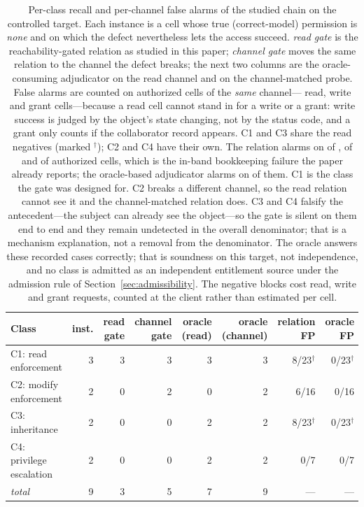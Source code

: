 \begin{table}[t]
\centering
\caption{Per-class recall and per-channel false alarms of the studied chain on the controlled target. Each instance is a cell whose true (correct-model) permission is \emph{none} and on which the defect nevertheless lets the access succeed. \emph{read gate} is the reachability-gated relation as studied in this paper; \emph{channel gate} moves the same relation to the channel the defect breaks; the next two columns are the oracle-consuming adjudicator on the read channel and on the channel-matched probe. False alarms are counted on authorized cells of the \emph{same} channel---\McNegRead{} read, \McNegWrite{} write and \McNegGrant{} grant cells---because a read cell cannot stand in for a write or a grant: write success is judged by the object's state changing, not by the status code, and a grant only counts if the collaborator record appears. C1 and C3 share the read negatives (marked $^{\dagger}$); C2 and C4 have their own. The relation alarms on \McFpRelRead{} of \McNegRead{}, \McFpRelWrite{} of \McNegWrite{} and \McFpRelGrant{} of \McNegGrant{} authorized cells, which is the in-band bookkeeping failure the paper already reports; the oracle-based adjudicator alarms on \McFpOracleMax{} of them. C1 is the class the gate was designed for. C2 breaks a different channel, so the read relation cannot see it and the channel-matched relation does. C3 and C4 falsify the antecedent---the subject can already see the object---so the gate is silent on them end to end and they remain undetected in the overall denominator; that is a mechanism explanation, not a removal from the denominator. The oracle answers these recorded cases correctly; that is soundness on this target, not independence, and no class is admitted as an independent entitlement source under the admission rule of Section~\ref{sec:admissibility}. The negative blocks cost \McReqNegRead{} read, \McReqNegWrite{} write and \McReqNegGrant{} grant requests, counted at the client rather than estimated per cell.}
\label{tab:multiclass}
\small
\begin{tabular*}{\textwidth}{@{\extracolsep{\fill}}lrrrrrrr}
\toprule
Class & inst. & read gate & channel gate & oracle (read) & oracle (channel) & relation FP & oracle FP \\
\midrule
C1: read enforcement & 3 & 3 & 3 & 3 & 3 & 8/23$^{\dagger}$ & 0/23$^{\dagger}$ \\
C2: modify enforcement & 2 & 0 & 2 & 0 & 2 & 6/16 & 0/16 \\
C3: inheritance & 2 & 0 & 0 & 2 & 2 & 8/23$^{\dagger}$ & 0/23$^{\dagger}$ \\
C4: privilege escalation & 2 & 0 & 0 & 2 & 2 & 0/7 & 0/7 \\
\addlinespace[2pt]
\emph{total} & 9 & 3 & 5 & 7 & 9 & --- & --- \\
\bottomrule
\end{tabular*}
\end{table}
